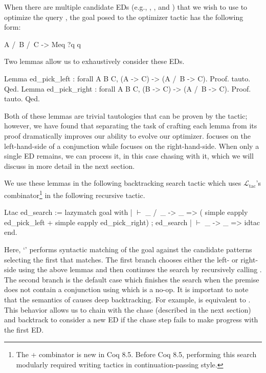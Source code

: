 \documentclass{sigplanconf}
\newcommand{\ltac}[0]{\ensuremath{\mathcal{L}_{\mathrm{tac}}}}
\begin{document}
When there are multiple candidate EDs (e.g., , , and ) that we wish to use to optimize the query , the goal posed to the optimizer tactic has the following form:
\begin{coq}
A /\ B /\ C -> Meq ?q q
\end{coq}

Two lemmas allow us to exhaustively consider these EDs.
\begin{coq}
Lemma ed_pick_left : forall {A B C}, (A -> C) -> (A /\ B -> C).
Proof. tauto. Qed.
Lemma ed_pick_right : forall {A B C}, (B -> C) -> (A /\ B -> C).
Proof. tauto. Qed.
\end{coq}
Both of these lemmas are trivial tautologies that can be proven by the  tactic; however, we have found that separating the task of crafting each lemma from its proof dramatically improves our ability to evolve our optimizer.
 focuses on the left-hand-side of a conjunction while  focuses on the right-hand-side.
When only a single ED remains, we can process it, in this case chasing with it, which we will discuss in more detail in the next section.

We use these lemmas in the following backtracking search tactic which uses \ltac's \coqe{+} combinator\footnote{The + combinator is new in Coq 8.5. Before Coq 8.5, performing this search modularly required writing tactics in continuation-passing style.} in the following recursive tactic.
\begin{coq}
Ltac ed_search :=
  lazymatch goal with
  | $\vdash$ _ /\ _ -> _ =>
    (  simple eapply ed_pick_left
     + simple eapply ed_pick_right) ; ed_search
  | $\vdash$ _ -> _ => idtac
  end.
\end{coq}
Here, `' performs syntactic matching of the goal against the candidate patterns selecting the first that matches.
The first branch chooses either the left- or right-side using the above lemmas and then continues the search by recursively calling .
The second branch is the default case which finishes the search when the premise does not contain a conjunction using  which is a no-op.
It is important to note that the semantics of \coqe{+} causes deep backtracking.
For example,  is equivalent to .
This behavior allows us to chain  with the chase (described in the next section) and backtrack to consider a new ED if the chase step fails to make progress with the first ED.
\end{document}
